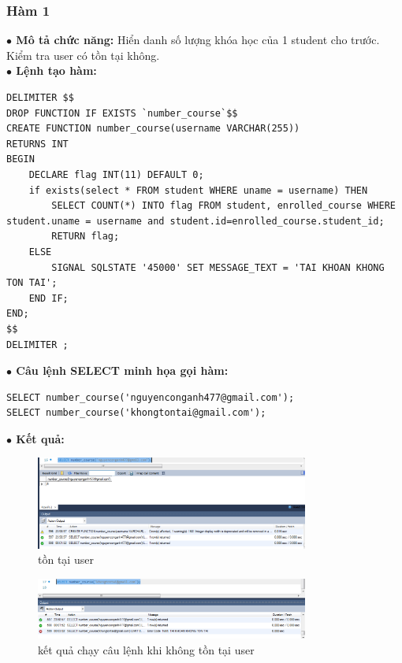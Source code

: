\documentclass[12pt,a4paper,titlepage]{article}
\begin{document}
\subsubsection{Hàm 1}
\textbf{$\bullet$ Mô tả chức năng:} Hiển danh số lượng khóa học của 1 student cho trước. Kiểm tra user có tồn tại không.\\
\textbf{$\bullet$ Lệnh tạo hàm:}
\begin{lstlisting}
DELIMITER $$
DROP FUNCTION IF EXISTS `number_course`$$
CREATE FUNCTION number_course(username VARCHAR(255))
RETURNS INT
BEGIN
	DECLARE flag INT(11) DEFAULT 0;
	if exists(select * FROM student WHERE uname = username) THEN
		SELECT COUNT(*) INTO flag FROM student, enrolled_course WHERE student.uname = username and student.id=enrolled_course.student_id;
		RETURN flag;
	ELSE
		SIGNAL SQLSTATE '45000' SET MESSAGE_TEXT = 'TAI KHOAN KHONG TON TAI';
    END IF;
END;
$$
DELIMITER ;
\end{lstlisting}
\textbf{$\bullet$ Câu lệnh SELECT minh họa gọi hàm:}
\begin{lstlisting}
SELECT number_course('nguyenconganh477@gmail.com');
SELECT number_course('khongtontai@gmail.com');
\end{lstlisting}
\textbf{$\bullet$ Kết quả:}
\begin{figure}[h!]
	\centering
	\caption{tồn tại user}
	\includegraphics[width=0.8\textwidth]{images/image2.png}
\end{figure}
\begin{figure}[h!]
	\centering
	\caption{kết quả chạy câu lệnh khi không tồn tại user}
	\includegraphics[width=0.8\textwidth]{images/image1.png}
\end{figure}
\end{document}
